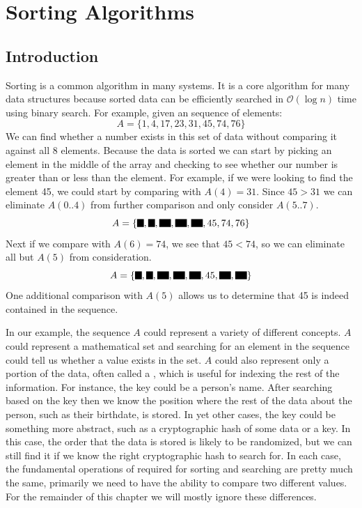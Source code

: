 
\chapter{Sorting Algorithms}
\glsresetall
\label{chapter:sorting}

\section{Introduction}
\label{sec:sorting_introduction}

Sorting is a common algorithm in many systems.  It is a core algorithm for many data structures because sorted data can be efficiently searched in $\mathcal{O}(\log n)$ time using binary search.  For example, given an sequence of elements:
\begin{equation}
A = \{1,4,17,23,31,45,74,76\}
\end{equation}
We can find whether a number exists in this set of data without comparing it against all 8 elements.  Because the data is sorted we can start by picking an element in the middle of the array and checking to see whether our number is greater than or less than the element.  For example, if we were looking to find the element 45, we could start by comparing with $A(4) = 31$.  Since $45 > 31$ we can eliminate $A(0..4)$ from further comparison and only consider $A(5..7)$. 
\begin{equation}
\setlength{\fboxsep}{1pt}
A = \{\colorbox{black}{1},\colorbox{black}{4},\colorbox{black}{17},\colorbox{black}{23},\colorbox{black}{31},45,74,76\}
\end{equation}
Next if we compare with $A(6) = 74$, we see that $45 < 74$, so we can eliminate all but $A(5)$ from consideration. 
\begin{equation}
\setlength{\fboxsep}{1pt}
A = \{\colorbox{black}{1},\colorbox{black}{4},\colorbox{black}{17},\colorbox{black}{23},\colorbox{black}{31},45,\colorbox{black}{74},\colorbox{black}{76}\}
\end{equation}
 One additional comparison with $A(5)$ allows us to determine that 45 is indeed contained in the sequence.

In our example, the sequence $A$ could represent a variety of different concepts.  $A$ could represent a mathematical set and searching for an element in the sequence could tell us whether a value exists in the set.  $A$ could also represent only a portion of the data, often called a , which is useful for indexing the rest of the information.  For instance, the key could be a person's name.  After searching based on the key then we know the position where the rest of the data about the person, such as their birthdate, is stored.  In yet other cases, the key could be something more abstract, such as a cryptographic hash of some data or a key.  In this case, the order that the data is stored is likely to be randomized, but we can still find it if we know the right cryptographic hash to search for.  In each case, the fundamental operations of required for sorting and searching are pretty much the same, primarily we need to have the ability to compare two different values.  For the remainder of this chapter we will mostly ignore these differences. 

